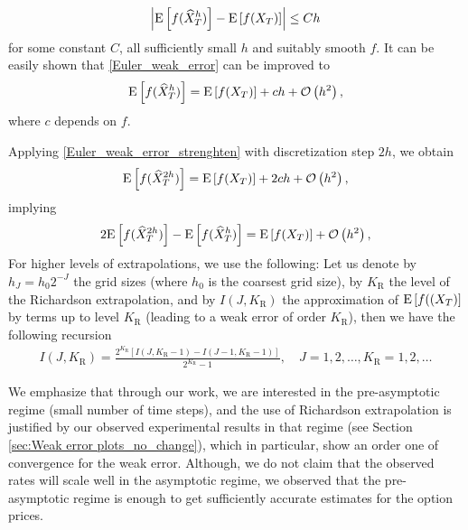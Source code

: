 \begin{align}\label{Euler_weak_error}
	\left\lvert\mathrm{E}\left[f(\widehat{X}_T^h)\right]-\mathrm{E}\left[f(X_T)\right] \right\rvert  \leq C h
\end{align}
for some constant $C$, all sufficiently small $h$ and suitably smooth $f$. It can be easily  shown that  \eqref{Euler_weak_error} can be improved to
\begin{align}\label{Euler_weak_error_strenghten}
	\mathrm{E}\left[f(\widehat{X}_T^h)\right]= \mathrm{E}\left[f(X_T)\right] + c h +{\mathcal{O}}\left(h^2\right) ,
\end{align}
where $c$ depends on $f$. 

Applying \eqref{Euler_weak_error_strenghten} with discretization step $2h$, we  obtain
\begin{align}\label{Euler_weak_error_strenghten_2h}
	\mathrm{E}\left[f(\widehat{X}_T^{2h})\right]= \mathrm{E}\left[f(X_T)\right] + 2 c h +{\mathcal{O}}\left(h^2\right) ,
\end{align}
implying
\begin{align}\label{Richardson_extrapol}
	2 \mathrm{E}\left[f(\widehat{X}_T^{2h})\right]- \mathrm{E}\left[f(\widehat{X}_T^{h})\right] =\mathrm{E}\left[f(X_T)\right] + {\mathcal{O}}\left(h^2\right) ,
\end{align}
For higher levels of extrapolations, we use the following: Let us denote by $h_J=h_0 2^{-J}$ the grid sizes (where $h_0$ is the coarsest grid size), by $K_\text{R}$ the level of the Richardson extrapolation, and by $I(J,K_\text{R})$ the approximation of $\mathrm{E}\left[f((X_T)\right]$ by terms up to level $K_\text{R}$ (leading to a weak error of order $K_\text{R}$), then we have the following recursion 
\begin{align}
I(J,K_\text{R})=\frac{2^{K_\text{R}}\left[I(J,K_\text{R}-1)-I(J-1,K_\text{R}-1)\right]}{2^{K_\text{R}}-1},\quad J=1,2,\dots, K_\text{R}=1,2,\dots
\end{align}
\begin{remark}
We emphasize that through our work, we are interested in the pre-asymptotic regime (small number of time steps), and the use of Richardson extrapolation is justified by our observed experimental results in that regime (see Section \ref{sec:Weak error plots_no_change}),  which in particular, show an order one of convergence for the weak error. Although, we do not claim that the observed rates will scale well in the asymptotic regime, we observed that the pre-asymptotic regime is enough to get sufficiently accurate estimates for the option prices. 
\end{remark}
